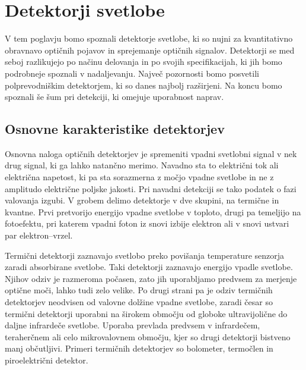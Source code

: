 
\chapter{Detektorji svetlobe}

V tem poglavju bomo spoznali detektorje svetlobe, ki so nujni za kvantitativno obravnavo
optičnih pojavov in sprejemanje optičnih signalov. Detektorji
se med seboj razlikujejo po načinu delovanja in po svojih specifikacijah, 
ki jih bomo podrobneje spoznali v nadaljevanju. Največ
pozornosti bomo posvetili polprevodniškim detektorjem, ki so danes najbolj razširjeni.
Na koncu bomo spoznali še šum pri detekciji, ki omejuje uporabnost naprav.

\section{Osnovne karakteristike detektorjev}
Osnovna naloga optičnih detektorjev je spremeniti vpadni svetlobni signal 
v nek drug signal, ki ga lahko natančno merimo. Navadno sta to električni tok 
ali električna napetost, ki pa sta sorazmerna z močjo vpadne svetlobe 
in ne z amplitudo električne poljske jakosti. Pri navadni detekciji se tako
podatek o fazi valovanja izgubi. V grobem delimo detektorje v dve skupini, 
na termične in kvantne. 
Prvi pretvorijo energijo vpadne svetlobe v toploto, drugi pa temeljijo na 
fotoefektu, pri katerem vpadni foton iz snovi izbije 
elektron ali v snovi ustvari par elektron--vrzel.

Termični detektorji zaznavajo svetlobo preko povišanja temperature 
senzorja zaradi absorbirane svetlobe. Taki detektorji zaznavajo energijo 
vpadle svetlobe. Njihov odziv je razmeroma počasen, zato jih uporabljamo
predvsem za merjenje optične moči, lahko tudi zelo velike. Po drugi strani pa je odziv
termičnih detektorjev neodvisen
od valovne dolžine vpadne svetlobe, zaradi česar so termični detektorji uporabni na 
širokem območju od globoke ultravijolične do daljne infrardeče svetlobe. 
Uporaba
prevlada predvsem v infrardečem, teraherčnem ali celo mikrovalovnem območju, kjer so 
drugi detektorji bistveno manj občutljivi. 
Primeri termičnih detektorjev so bolometer, termočlen in piroelektrični detektor.

